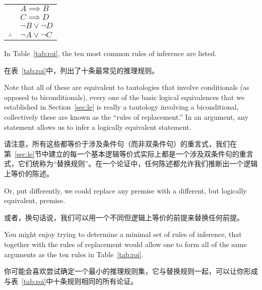 \begin{center}
\begin{tabular}{cl}
 & $A \implies B$ \\
 & $C \implies D$ \\ 
 & ${\lnot}B \lor {\lnot}D$ \\ \hline
$\therefore$ & ${\lnot}A \lor {\lnot}C$ \\
\end{tabular}
\end{center}

In Table~\ref{tab:roi}, the ten most common 
rules of inference are listed.

在表~\ref{tab:roi}中，列出了十条最常见的推理规则。

Note that all of these are equivalent to tautologies that
involve conditionals (as opposed to biconditionals), every one of the 
basic logical equivalences that we established in Section~\ref{sec:le}
is really a tautology involving a biconditional, collectively these are
known as the ``rules of replacement.''  
In an argument, any statement
allows us to infer a logically equivalent statement.

请注意，所有这些都等价于涉及条件句（而非双条件句）的重言式，我们在第~\ref{sec:le}节中建立的每一个基本逻辑等价式实际上都是一个涉及双条件句的重言式，它们统称为“替换规则”。在一个论证中，任何陈述都允许我们推断出一个逻辑上等价的陈述。

Or, put differently,
we could replace any premise with a different, but logically equivalent,
premise.

或者，换句话说，我们可以用一个不同但逻辑上等价的前提来替换任何前提。

You might enjoy trying to determine a minimal set of rules of
inference, that together with the rules of replacement would allow one
to form all of the same arguments as the ten rules in Table~\ref{tab:roi}.

你可能会喜欢尝试确定一个最小的推理规则集，它与替换规则一起，可以让你形成与表~\ref{tab:roi}中十条规则相同的所有论证。

